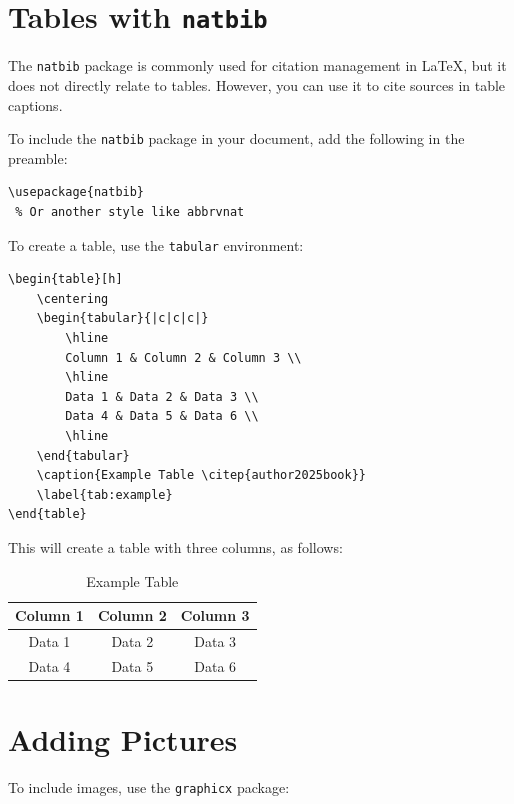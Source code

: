 \section{Tables with \texttt{natbib}}
The \texttt{natbib} package is commonly used for citation management in LaTeX, but it does not directly relate to tables. However, you can use it to cite sources in table captions.

To include the \texttt{natbib} package in your document, add the following in the preamble:

\begin{verbatim}
\usepackage{natbib}
 % Or another style like abbrvnat
\end{verbatim}

To create a table, use the \texttt{tabular} environment:

\begin{verbatim}
\begin{table}[h]
    \centering
    \begin{tabular}{|c|c|c|}
        \hline
        Column 1 & Column 2 & Column 3 \\
        \hline
        Data 1 & Data 2 & Data 3 \\
        Data 4 & Data 5 & Data 6 \\
        \hline
    \end{tabular}
    \caption{Example Table \citep{author2025book}}
    \label{tab:example}
\end{table}
\end{verbatim}

This will create a table with three columns, as follows:


\begin{table}[h]
    \centering
    \begin{tabular}{ccc}
        \hline
        Column 1 & Column 2 & Column 3 \\
        \hline
        Data 1 & Data 2 & Data 3 \\
        Data 4 & Data 5 & Data 6 \\
        \hline
    \end{tabular}
    \caption{Example Table \citep{author2025book}}
    \label{tab:example}
\end{table}



\section{Adding Pictures}
To include images, use the \texttt{graphicx} package:

